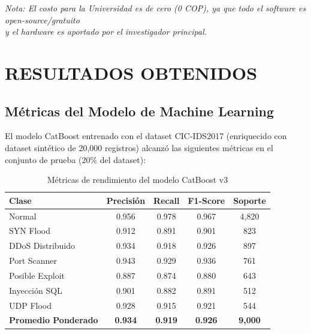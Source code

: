 \documentclass[12pt, letterpaper, oneside]{report}
\newcommand{\tabhead}[1]{\textbf{\color{white}#1}}
\begin{document}
\begin{center}
  \textit{Nota: El costo para la Universidad es de cero (0 COP), ya que todo el software es open-source/gratuito\\
  y el hardware es aportado por el investigador principal.}
\end{center}

\chapter{RESULTADOS OBTENIDOS}

\section{Métricas del Modelo de Machine Learning}

El modelo CatBoost entrenado con el dataset CIC-IDS2017 (enriquecido con dataset sintético de 20,000 registros) alcanzó las siguientes métricas en el conjunto de prueba (20\% del dataset):

\begin{table}[H]
  \centering
  \caption{Métricas de rendimiento del modelo CatBoost v3}
  \label{tab:metricas}
  \begin{tabular}{lcccc}
    \toprule
    \rowcolor{unipazblue}
    \tabhead{Clase} & \tabhead{Precisión} & \tabhead{Recall} & \tabhead{F1-Score} & \tabhead{Soporte} \\
    \midrule
    Normal            & 0.956 & 0.978 & 0.967 & 4,820 \\
    SYN Flood         & 0.912 & 0.891 & 0.901 & 823 \\
    DDoS Distribuido  & 0.934 & 0.918 & 0.926 & 897 \\
    Port Scanner      & 0.943 & 0.929 & 0.936 & 761 \\
    Posible Exploit   & 0.887 & 0.874 & 0.880 & 643 \\
    Inyección SQL     & 0.901 & 0.882 & 0.891 & 512 \\
    UDP Flood         & 0.928 & 0.915 & 0.921 & 544 \\
    \midrule
    \textbf{Promedio Ponderado} & \textbf{0.934} & \textbf{0.919} & \textbf{0.926} & \textbf{9,000} \\
    \bottomrule
  \end{tabular}
\end{table}
\end{document}
